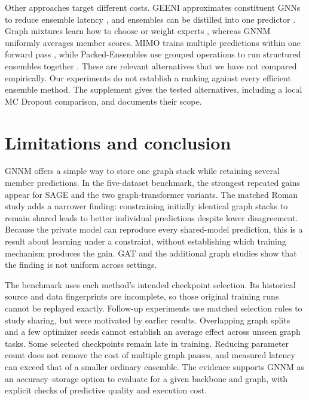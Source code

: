 \documentclass{article}
\begin{document}
Other approaches target different costs. GEENI approximates constituent GNNs to reduce ensemble latency \citep{nagarajan2022geeni}, and ensembles can be distilled into one predictor \citep{zhang2024e2gnn}. Graph mixtures learn how to choose or weight experts \citep{wang2023graph,deng2025mixture}, whereas GNNM uniformly averages member scores. MIMO trains multiple predictions within one forward pass \citep{havasi2021training}, while Packed-Ensembles use grouped operations to run structured ensembles together \citep{laurent2023packed}. These are relevant alternatives that we have not compared empirically. Our experiments do not establish a ranking against every efficient ensemble method. The supplement gives the tested alternatives, including a local MC Dropout comparison, and documents their scope.

\section{Limitations and conclusion}
GNNM offers a simple way to store one graph stack while retaining several member predictions. In the five-dataset benchmark, the strongest repeated gains appear for SAGE and the two graph-transformer variants. The matched Roman study adds a narrower finding: constraining initially identical graph stacks to remain shared leads to better individual predictions despite lower disagreement. Because the private model can reproduce every shared-model prediction, this is a result about learning under a constraint, without establishing which training mechanism produces the gain. GAT and the additional graph studies show that the finding is not uniform across settings.

The benchmark uses each method's intended checkpoint selection. Its historical source and data fingerprints are incomplete, so those original training runs cannot be replayed exactly. Follow-up experiments use matched selection rules to study sharing, but were motivated by earlier results. Overlapping graph splits and a few optimizer seeds cannot establish an average effect across unseen graph tasks. Some selected checkpoints remain late in training. Reducing parameter count does not remove the cost of multiple graph passes, and measured latency can exceed that of a smaller ordinary ensemble. The evidence supports GNNM as an accuracy--storage option to evaluate for a given backbone and graph, with explicit checks of predictive quality and execution cost.
\end{document}
